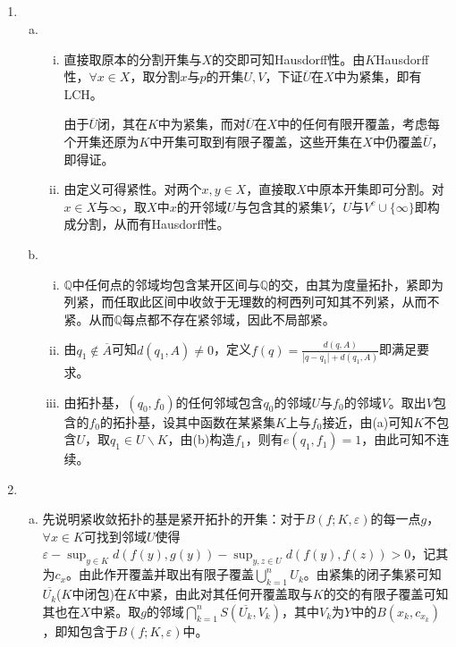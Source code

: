\documentclass[a4paper,UTF8,fontset=windows]{ctexart}
\begin{document}
\subsection{}
\begin{enumerate}[(1)]
    \item
    \begin{enumerate}[(a)]
    \item
    \begin{enumerate}[(i)]
    \item
    直接取原本的分割开集与$X$的交即可知Hausdorff性。由$K$Hausdorff性，$\forall x\in X$，取分割$x$与$p$的开集$U,V$，下证$\overline{U}$在$X$中为紧集，即有LCH。
    
    由于$\overline{U}$闭，其在$K$中为紧集，而对$\overline{U}$在$X$中的任何有限开覆盖，考虑每个开集还原为$K$中开集可取到有限子覆盖，这些开集在$X$中仍覆盖$\overline{U}$，即得证。
    
    \item
    由定义可得紧性。对两个$x,y\in X$，直接取$X$中原本开集即可分割。对$x\in X$与$\infty$，取$X$中$x$的开邻域$U$与包含其的紧集$V$，$U$与$V^c\cup\{\infty\}$即构成分割，从而有Hausdorff性。
    \end{enumerate}
    
    \item
    \begin{enumerate}[(i)]
    \item
    $\mathbb{Q}$中任何点的邻域均包含某开区间与$\mathbb{Q}$的交，由其为度量拓扑，紧即为列紧，而任取此区间中收敛于无理数的柯西列可知其不列紧，从而不紧。从而$\mathbb{Q}$每点都不存在紧邻域，因此不局部紧。
    
    \item
    由$q_1\notin\overline{A}$可知$d(q_1,A)\ne0$，定义$f(q)=\frac{d(q,A)}{|q-q_1|+d(q_1,A)}$即满足要求。
    
    \item
    由拓扑基，$(q_0,f_0)$的任何邻域包含$q_0$的邻域$U$与$f_0$的邻域$V$。取出$V$包含的$f_0$的拓扑基，设其中函数在某紧集$K$上与$f_0$接近，由(a)可知$K$不包含$U$，取$q_1\in U\backslash K$，由(b)构造$f_1$，则有$e(q_1,f_1)=1$，由此可知不连续。
    \end{enumerate}
    \end{enumerate}
    
    \item
    \begin{enumerate}[(a)]
    \item
    先说明紧收敛拓扑的基是紧开拓扑的开集：对于$B(f;K,\varepsilon)$的每一点$g$，$\forall x\in K$可找到邻域$U$使得$\varepsilon-\sup_{y\in K}d(f(y),g(y))-\sup_{y,z\in U}d(f(y),f(z))>0$，记其为$c_x$。由此作开覆盖并取出有限子覆盖$\bigcup_{k=1}^nU_k$。由紧集的闭子集紧可知$\overline{U_k}$($K$中闭包)在$K$中紧，由此对其任何开覆盖取与$K$的交的有限子覆盖可知其也在$X$中紧。取$g$的邻域$\bigcap_{k=1}^nS(\overline{U_k},V_k)$，其中$V_k$为$Y$中的$B(x_k,c_{x_k})$，即知包含于$B(f;K,\varepsilon)$中。
    

\end{enumerate}
\end{enumerate}
\end{document}

